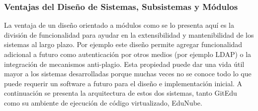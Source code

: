 \subsubsection{Ventajas del Diseño de Sistemas, Subsistemas y Módulos}
La ventaja de un diseño orientado a módulos como se lo presenta aquí es la división de funcionalidad para ayudar en la extensibilidad y mantenibilidad de los sistemas al largo plazo. Por ejemplo este diseño permite agregar funcionalidad adicional a futuro como autenticación por otros medios (por ejemplo LDAP) o la integración de mecanismos anti-plagio. Esta propiedad puede dar una vida útil mayor a los sistemas desarrolladas porque muchas veces no se conoce todo lo que puede requerir un software a futuro para el diseño e implementación inicial. A continuación se presenta la arquitectura de estos dos sistemas, tanto GitEdu como su ambiente de ejecución de código virtualizado, EduNube.


